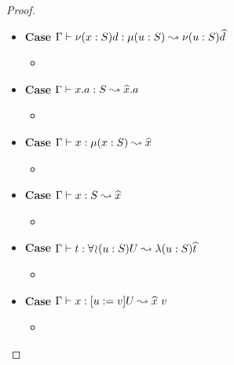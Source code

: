 \begin{proof}
\begin{itemize}
        \begin{itemize}
            \item \TODOTHIS
        \end{itemize}
        \item \textbf{Case}
            $\Gamma \vdash \nu(x:S)d: \mu(u : S) \leadsto \nu(u:S)\widehat{d}$
        \begin{itemize}
            \item \TODOTHIS
        \end{itemize}
        \item \textbf{Case} $\Gamma \vdash x.a: S \leadsto \widehat{x}.a$
        \begin{itemize}
            \item \TODOTHIS
        \end{itemize}
        \item \textbf{Case} $\Gamma \vdash x: \mu(x : S) \leadsto \widehat{x}$
        \begin{itemize}
            \item \TODOTHIS
        \end{itemize}
        \item \textbf{Case} $\Gamma \vdash x: S \leadsto \widehat{x}$
        \begin{itemize}
            \item \TODOTHIS
        \end{itemize}
        \item \textbf{Case}
            $\Gamma \vdash t: \forall\!\wr\!(u:S)U \leadsto \lambda(u:S)\widehat{t}$
        \begin{itemize}
            \item \TODOTHIS
        \end{itemize}
        \item \textbf{Case} $\Gamma \vdash x: [u := v]U \leadsto \widehat{x}\ v$
        \begin{itemize}
            \item \TODOTHIS
        \end{itemize}
    \end{itemize}
\end{proof}
